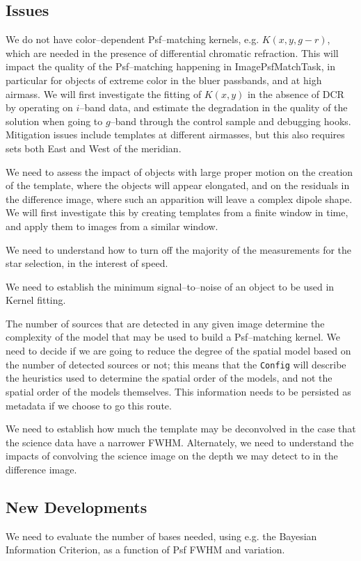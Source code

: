 \documentclass[12pt]{article}
\begin{document}
\subsection{Issues}
We do not have color--dependent Psf--matching kernels,
e.g. $K(x,y,g-r)$, which are needed in the presence of differential
chromatic refraction.  This will impact the quality of the
Psf--matching happening in ImagePsfMatchTask, in particular for
objects of extreme color in the bluer passbands, and at high airmass.
We will first investigate the fitting of $K(x,y)$ in the absence of
DCR by operating on $i$--band data, and estimate the degradation in
the quality of the solution when going to $g$--band through the
control sample and debugging hooks.  Mitigation issues include
templates at different airmasses, but this also requires sets both East
and West of the meridian.

We need to assess the impact of objects with large proper motion on
the creation of the template, where the objects will appear elongated,
and on the residuals in the difference image, where such an apparition
will leave a complex dipole shape.  We will first investigate this by
creating templates from a finite window in time, and apply them to
images from a similar window.

We need to understand how to turn off the majority of the measurements
for the star selection, in the interest of speed.

We need to establish the minimum signal--to--noise of an object to be
used in Kernel fitting.

The number of sources that are detected in any given image determine
the complexity of the model that may be used to build a Psf--matching
kernel.  We need to decide if we are going to reduce the degree of the
spatial model based on the number of detected sources or not; this
means that the {\tt Config} will describe the heuristics used to
determine the spatial order of the models, and not the spatial order
of the models themselves.  This information needs to be persisted as
metadata if we choose to go this route.

We need to establish how much the template may be deconvolved in the
case that the science data have a narrower FWHM.  Alternately, we need
to understand the impacts of convolving the science image on the depth
we may detect to in the difference image.

\subsection{New Developments}
We need to evaluate the number of bases needed, using e.g. the
Bayesian Information Criterion, as a function of Psf FWHM and
variation.
\end{document}
